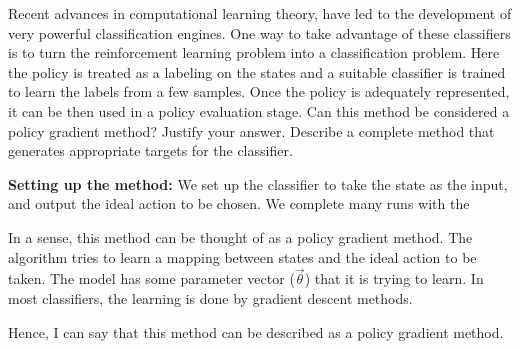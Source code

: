\documentclass[addpoints,12pt,solution]{exam}
\begin{document}
\begin{questions}
\begin{solution}
\begin{enumerate}
            \end{enumerate}
        \end{solution}

        \question[5] [PG] Recent advances in computational learning theory, have led to the development of very powerful classification engines. One way to take advantage of these classifiers is to turn the reinforcement learning problem into a classification problem. Here the policy is treated as a labeling on the states and a suitable classifier is trained to learn the labels from a few samples. Once the policy is adequately represented, it can be then used in a policy evaluation stage. Can this method be considered a policy gradient method? Justify your answer. Describe a complete method that generates appropriate targets for the classifier.
        \begin{solution}
            \textbf{Setting up the method:}
            We set up the classifier to take the state as the input, and output the ideal action to be chosen.
            We complete many runs with the

            In a sense, this method can be thought of as a policy gradient method. The algorithm tries to learn a mapping between states and the ideal action to be taken. The model has some parameter vector ($\vec{\theta}$) that it is trying to learn. In most classifiers, the learning is done by gradient descent methods.

            Hence, I can say that this method can be described as a policy gradient method.

        \end{solution}

    \end{questions}
\end{document}
